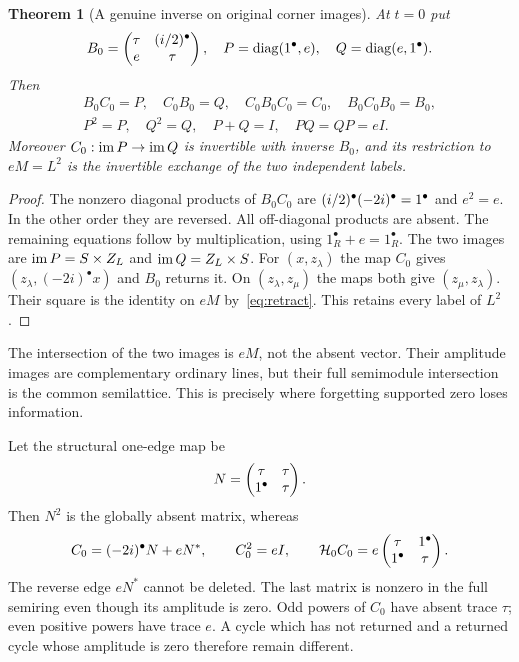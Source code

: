 \documentclass[11pt,a4paper]{article}
\newtheorem{theorem}{Theorem}[section]\newtheorem{proposition}[theorem]{Proposition}\newtheorem{lemma}[theorem]{Lemma}\newtheorem{corollary}[theorem]{Corollary}
\theoremstyle{definition}\newtheorem{definition}[theorem]{Definition}\newtheorem{remark}[theorem]{Remark}
\begin{document}
\begin{theorem}[A genuine inverse on original corner images]
At $t=0$ put
\begin{equation}
 B_0=\begin{pmatrix}\tau&(i/2)^\bullet\\e&\tau\end{pmatrix},
 \quad P=\operatorname{diag}(1^\bullet,e),\quad Q=\operatorname{diag}(e,1^\bullet).
                                                        \label{eq:partialinverse}
\end{equation}
Then
\begin{gather}
 B_0C_0=P,\quad C_0B_0=Q,\quad C_0B_0C_0=C_0,\quad B_0C_0B_0=B_0,\label{eq:regularinverse}\\
 P^2=P,\quad Q^2=Q,\quad P+Q=I,\quad PQ=QP=eI.           \label{eq:corners}
\end{gather}
Moreover $C_0:\operatorname{im} P\to\operatorname{im} Q$ is invertible with inverse $B_0$, and its restriction to $eM=L^2$ is the invertible exchange of the two independent labels.
\end{theorem}
\begin{proof}
The nonzero diagonal products of $B_0C_0$ are $(i/2)^\bullet(-2i)^\bullet=1^\bullet$ and $e^2=e$. In the other order they are reversed. All off-diagonal products are absent. The remaining equations follow by multiplication, using $1_R^\bullet+e=1_R^\bullet$.
The two images are $\operatorname{im} P=S\times Z_L$ and $\operatorname{im} Q=Z_L\times S$. For $(x,z_\lambda)$ the map $C_0$ gives $(z_\lambda,(-2i)^\bullet x)$ and $B_0$ returns it. On $(z_\lambda,z_\mu)$ the maps both give $(z_\mu,z_\lambda)$. Their square is the identity on $eM$ by~\eqref{eq:retract}. This retains every label of $L^2$.
\end{proof}
The intersection of the two images is $eM$, not the absent vector. Their amplitude images are complementary ordinary lines, but their full semimodule intersection is the common semilattice. This is precisely where forgetting supported zero loses information.

Let the structural one-edge map be
\[
 N=\begin{pmatrix}\tau&\tau\\1^\bullet&\tau\end{pmatrix}.
\]
Then $N^2$ is the globally absent matrix, whereas
\begin{equation}
 C_0=(-2i)^\bullet N+eN^*,\qquad C_0^2=eI,
 \qquad \mathcal H_0C_0=e\begin{pmatrix}\tau&1^\bullet\\1^\bullet&\tau\end{pmatrix}.
                                                        \label{eq:ghost}
\end{equation}
The reverse edge $eN^*$ cannot be deleted. The last matrix is nonzero in the full semiring even though its amplitude is zero. Odd powers of $C_0$ have absent trace $\tau$; even positive powers have trace $e$. A cycle which has not returned and a returned cycle whose amplitude is zero therefore remain different.
\end{document}
